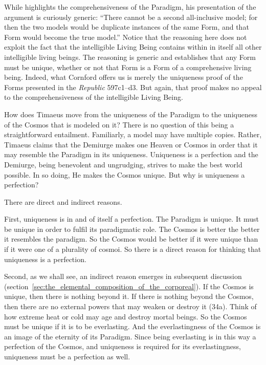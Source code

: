 While \citet[42--3]{Cornford:1935fk} highlights the comprehensiveness of the Paradigm, his presentation of the argument is curiously generic: ``There cannot be a second all-inclusive model; for then the two models would be duplicate instances of the same Form, and that Form would become the true model.'' Notice that the reasoning here does not exploit the fact that the intelligible Living Being contains within in itself all other intelligible living beings. The reasoning is generic and establishes that any Form must be unique, whether or not that Form is a Form of a comprehensive living being. Indeed, what Cornford offers us is merely the uniqueness proof of the Forms presented in the \emph{Republic} 597c1--d3. But again, that proof makes no appeal to the comprehensiveness of the intelligible Living Being.

How does Timaeus move from the uniqueness of the Paradigm to the uniqueness of the Cosmos that is modeled on it? There is no question of this being a straightforward entailment. Familiarly, a model may have multiple copies. Rather, Timaeus claims that the Demiurge makes one Heaven or Cosmos in order that it may resemble the Paradigm in its uniqueness. Uniqueness is a perfection and the Demiurge, being benevolent and ungrudging, strives to make the best world possible. In so doing, He makes the Cosmos unique. But why is uniqueness a perfection?

There are direct and indirect reasons.

First, uniqueness is in and of itself a perfection. The Paradigm is unique. It must be unique in order to fulfil its paradigmatic role. The Cosmos is better the better it resembles the paradigm. So the Cosmos would be better if it were unique than if it were one of a plurality of cosmoi. So there is a direct reason for thinking that uniqueness is a perfection. 

Second, as we shall see, an indirect reason emerges in subsequent discussion (section~\ref{sec:the_elemental_composition_of_the_corporeal}). If the Cosmos is unique, then there is nothing beyond it. If there is nothing beyond the Cosmos, then there are no external powers that may weaken or destroy it (34a). Think of how extreme heat or cold may age and destroy mortal beings. So the Cosmos must be unique if it is to be everlasting. And the everlastingness of the Cosmos is an image of the eternity of its Paradigm. Since being everlasting is in this way a perfection of the Cosmos, and uniqueness is required for its everlastingness, uniqueness must be a perfection as well.

